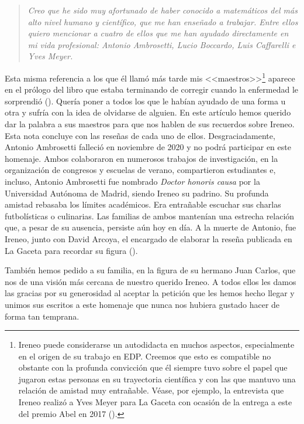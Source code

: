 \begin{quote}
\textit{Creo que he sido muy afortunado de haber conocido a matem\'aticos del m\'as alto nivel humano y cient\'ifico, que me han ense\~nado a trabajar. Entre ellos quiero mencionar a cuatro de ellos que me han ayudado directamente en mi vida profesional: Antonio Ambrosetti, Lucio Boccardo, Luis Caffarelli  e Yves Meyer.}
\end{quote}

Esta misma referencia a los que \'el llam\'o m\'as tarde mis <<maestros>>\footnote{Ireneo puede considerarse un autodidacta en muchos aspectos, especialmente en el origen de su trabajo en EDP. Creemos que esto es compatible no obstante con la profunda convicci\'on que \'el siempre tuvo sobre el papel que jugaron estas personas   en su trayectoria  cient\'ifica y con las que  mantuvo una relaci\'on de amistad muy entra\~nable. V\'ease, por ejemplo,  la entrevista que Ireneo realiz\'o a Yves Meyer para {\sc La Gaceta}  con ocasi\'on de la entrega a este del premio Abel en 2017  (\cite{IP1}).} aparece en el pr\'ologo del libro que estaba terminando de corregir cuando la enfermedad le sorprendi\'o {(\cite{PSbook})}. Quer\'ia poner a todos los que le hab\'ian ayudado de una forma u otra y sufr\'ia con la idea de olvidarse de alguien. En este art\'iculo hemos querido dar la palabra a sus maestros para que nos hablen de sus recuerdos sobre Ireneo. Esta nota concluye con las rese\~nas de cada uno de ellos. Desgraciadamente, Antonio Ambrosetti falleci\'o en noviembre de 2020 y no podr\'a participar en este homenaje. Ambos colaboraron en numerosos trabajos de investigaci\'on, en la organizaci\'on de congresos y escuelas de verano, compartieron estudiantes e, incluso, Antonio Ambrosetti fue nombrado \textit{Doctor honoris causa} por la Universidad Aut\'onoma de Madrid, siendo Ireneo su padrino.  Su profunda amistad rebasaba los l\'imites acad\'emicos. Era entra\~nable escuchar sus charlas futbol\'isticas o culinarias. Las familias de ambos manten\'ian una estrecha relaci\'on que, a pesar de su ausencia, persiste a\'un hoy en d\'ia. A la muerte de Antonio, fue Ireneo, junto con David Arcoya, el encargado de elaborar la rese\~na publicada en {\sc La Gaceta}  para recordar su figura (\cite{AP}).



Tambi\'en hemos pedido a su familia, en la figura de su hermano Juan Carlos, que nos de una visi\'on m\'as cercana de nuestro querido Ireneo. A todos ellos les damos las gracias por su generosidad al aceptar la petici\'on que les  hemos hecho llegar y unimos sus escritos a este homenaje que nunca nos hubiera gustado hacer de forma tan temprana.

